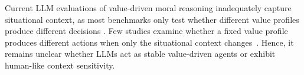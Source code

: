 \documentclass[11pt]{article}
\begin{document}




Current LLM evaluations of value-driven moral reasoning inadequately capture situational context, as most benchmarks only test whether different value profiles produce different decisions \citep{guo2026counterfactual, scherrer2023evaluating, jiao2025ai, mahajan2025mapping, schacht2025mapping}. Few studies examine whether a fixed value profile produces different actions when only the situational context changes~\citep{harry2026beyond, sauter2026between, backmann2025ethics}. Hence, it remains unclear whether LLMs act as stable value-driven agents or exhibit human-like context sensitivity.
\end{document}
